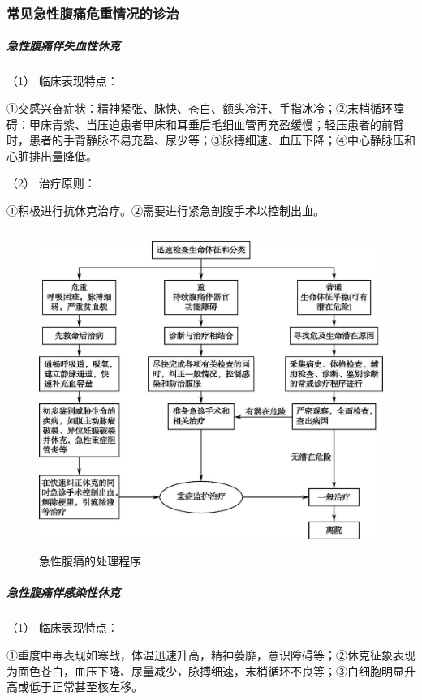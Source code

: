 \subsubsection{常见急性腹痛危重情况的诊治}

\subparagraph{急性腹痛伴失血性休克}

\hypertarget{text00026.htmlux5cux23CHP1-10-3-2-1-1}{}
（1） 临床表现特点：

①交感兴奋症状：精神紧张、脉快、苍白、额头冷汗、手指冰冷；②末梢循环障碍：甲床青紫、当压迫患者甲床和耳垂后毛细血管再充盈缓慢；轻压患者的前臂时，患者的手背静脉不易充盈、尿少等；③脉搏细速、血压下降；④中心静脉压和心脏排出量降低。

\hypertarget{text00026.htmlux5cux23CHP1-10-3-2-1-2}{}
（2） 治疗原则：

①积极进行抗休克治疗。②需要进行紧急剖腹手术以控制出血。

\begin{figure}[!htbp]
 \centering
 \includegraphics[width=4.71875in,height=4.10417in]{./images/Image00052.jpg}
 \captionsetup{justification=centering}
 \caption{急性腹痛的处理程序}
 \label{fig10-1}
  \end{figure} 

\subparagraph{急性腹痛伴感染性休克}

\hypertarget{text00026.htmlux5cux23CHP1-10-3-2-2-1}{}
（1） 临床表现特点：

①重度中毒表现如寒战，体温迅速升高，精神萎靡，意识障碍等；②休克征象表现为面色苍白，血压下降、尿量减少，脉搏细速，末梢循环不良等；③白细胞明显升高或低于正常甚至核左移。

